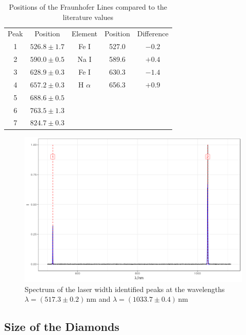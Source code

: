 \begin{table}
	\centering
	\begin{tabular}{c|c|c|c|c}
		Peak&Position&Element&Position \cite{fraunhoferlines}&Difference\\
		1&$526.8\pm1.7$&Fe I&527.0&$-0.2$\\
		2&$590.0\pm0.5$&Na I&589.6&$+0.4$\\
		3&$628.9\pm0.3$&Fe I&630.3&$-1.4$\\
		4&$657.2\pm0.3$&H $\alpha$&656.3&$+0.9$\\
		5&$688.6\pm0.5$&&&\\
		6&$763.5\pm1.3$&&&\\
		7&$824.7\pm0.3$&&&\\
	\end{tabular}
	\caption{Positions of the Fraunhofer Lines compared to the literature values}
\end{table}

\begin{figure}
	\centering
	\includegraphics[width=\textwidth]{../figures/laserspectrum.png}
	\caption{Spectrum of the laser width identified peaks at the wavelengths $\lambda=(517.3\pm0.2)\,\mathrm{nm}$ and $\lambda=(1033.7\pm0.4)\,\mathrm{nm}$}
	\label{fig:laserspectrum}
\end{figure}

\subsection{Size of the Diamonds}

